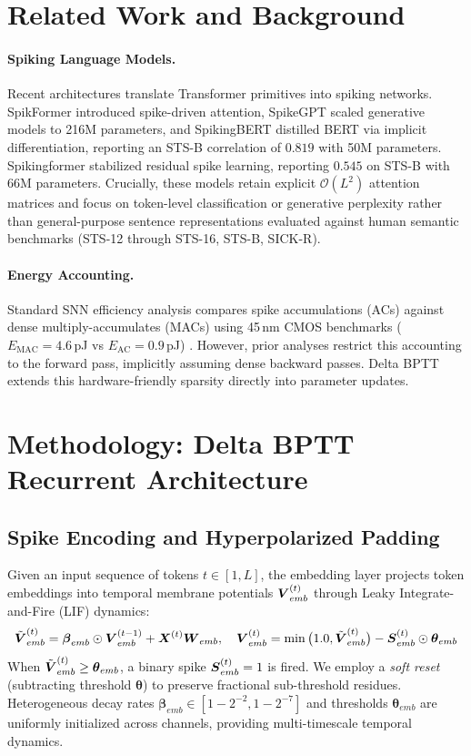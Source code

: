 \documentclass[runningheads]{llncs}
\begin{document}
\section{Related Work and Background}

\paragraph{Spiking Language Models.} Recent architectures translate Transformer primitives into spiking networks. SpikFormer \cite{zhou2023spikformer} introduced spike-driven attention, SpikeGPT \cite{zhu2023spikegpt} scaled generative models to 216M parameters, and SpikingBERT \cite{bal2024spikingbert} distilled BERT via implicit differentiation, reporting an STS-B correlation of $0.819$ with 50M parameters. Spikingformer \cite{zhou2025spikingformer} stabilized residual spike learning, reporting $0.545$ on STS-B with 66M parameters. Crucially, these models retain explicit $\mathcal{O}(L^2)$ attention matrices and focus on token-level classification or generative perplexity rather than general-purpose sentence representations evaluated against human semantic benchmarks (STS-12 through STS-16, STS-B, SICK-R).

\paragraph{Energy Accounting.} Standard SNN efficiency analysis compares spike accumulations (ACs) against dense multiply-accumulates (MACs) using 45\,nm CMOS benchmarks ($E_{\text{MAC}} = 4.6$\,pJ vs $E_{\text{AC}} = 0.9$\,pJ) \cite{horowitz2014computing}. However, prior analyses restrict this accounting to the forward pass, implicitly assuming dense backward passes. Delta BPTT extends this hardware-friendly sparsity directly into parameter updates.

\section{Methodology: Delta BPTT Recurrent Architecture}

\subsection{Spike Encoding and Hyperpolarized Padding}
Given an input sequence of tokens $t \in [1, L]$, the embedding layer projects token embeddings into temporal membrane potentials $\boldsymbol{V}_{emb}^{(t)}$ through Leaky Integrate-and-Fire (LIF) dynamics:
\begin{equation}
\tilde{\boldsymbol{V}}_{emb}^{(t)} = \boldsymbol{\beta}_{emb} \odot \boldsymbol{V}_{emb}^{(t-1)} + \boldsymbol{X}^{(t)} \boldsymbol{W}_{emb}, \quad \boldsymbol{V}_{emb}^{(t)} = \min\big(1.0, \tilde{\boldsymbol{V}}_{emb}^{(t)}\big) - \boldsymbol{S}_{emb}^{(t)} \odot \boldsymbol{\theta}_{emb}
\end{equation}
When $\tilde{\boldsymbol{V}}_{emb}^{(t)} \ge \boldsymbol{\theta}_{emb}$, a binary spike $\boldsymbol{S}_{emb}^{(t)} = 1$ is fired. We employ a \textit{soft reset} (subtracting threshold $\bm{\theta}$) to preserve fractional sub-threshold residues. Heterogeneous decay rates $\bm{\beta}_{emb} \in [1 - 2^{-2}, 1 - 2^{-7}]$ and thresholds $\bm{\theta}_{emb}$ are uniformly initialized across channels, providing multi-timescale temporal dynamics.
\end{document}
